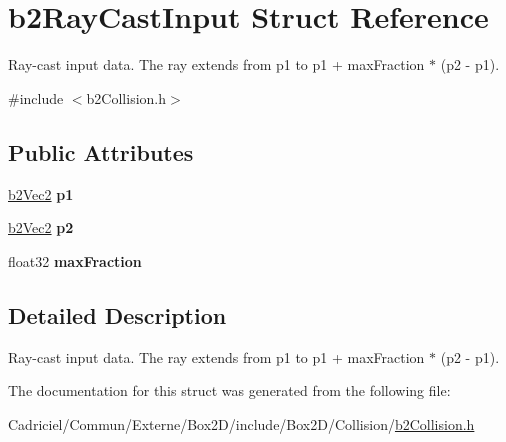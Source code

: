 \hypertarget{structb2_ray_cast_input}{}\section{b2\+Ray\+Cast\+Input Struct Reference}
\label{structb2_ray_cast_input}


Ray-\/cast input data. The ray extends from p1 to p1 + max\+Fraction $\ast$ (p2 -\/ p1).  




{\ttfamily \#include $<$b2\+Collision.\+h$>$}

\subsection*{Public Attributes}
\begin{DoxyCompactItemize}
\item 
\hyperlink{structb2_vec2}{b2\+Vec2} {\bfseries p1}\hypertarget{structb2_ray_cast_input_a7254a7062422833b1124fa464ab4caf3}{}\label{structb2_ray_cast_input_a7254a7062422833b1124fa464ab4caf3}

\item 
\hyperlink{structb2_vec2}{b2\+Vec2} {\bfseries p2}\hypertarget{structb2_ray_cast_input_a850102c843469781a3a627c871043d0b}{}\label{structb2_ray_cast_input_a850102c843469781a3a627c871043d0b}

\item 
float32 {\bfseries max\+Fraction}\hypertarget{structb2_ray_cast_input_acb5c88e0ef2c3716a1334611522ab0b2}{}\label{structb2_ray_cast_input_acb5c88e0ef2c3716a1334611522ab0b2}

\end{DoxyCompactItemize}


\subsection{Detailed Description}
Ray-\/cast input data. The ray extends from p1 to p1 + max\+Fraction $\ast$ (p2 -\/ p1). 

The documentation for this struct was generated from the following file\+:\begin{DoxyCompactItemize}
\item 
Cadriciel/\+Commun/\+Externe/\+Box2\+D/include/\+Box2\+D/\+Collision/\hyperlink{b2_collision_8h}{b2\+Collision.\+h}\end{DoxyCompactItemize}
